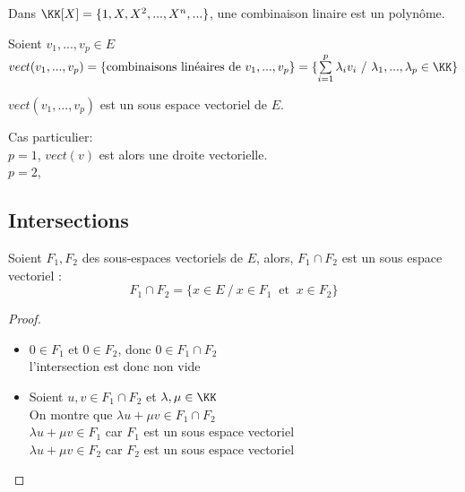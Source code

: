 \documentclass[../main.tex]{subfile}
\begin{document}
\begin{ex}
	Dans $\KK[X] = \{1, X, X^2, ..., X^n, ...\}$, une combinaison linaire est un polynôme.
\end{ex}

\begin{defi}
	Soient $v_1, ..., v_p \in E$\\
	$vect(v_1, ..., v_p) = \{\text{combinaisons linéaires de $v_1, ..., v_p$}\} = \{\sum\limits_{i=1}^p \lambda_i v_i \ / \ \lambda_1, ..., \lambda_p \in \KK\}$
\end{defi}

\begin{prop}
	$vect(v_1, ..., v_p)$ est un sous espace vectoriel de $E$.
\end{prop}

\begin{ex}
	Cas particulier:\\
	$p = 1$, $vect(v)$ est alors une droite vectorielle.\\
	$p=2$, %
\end{ex}

\subsection{Intersections}
\begin{prop}
	Soient $F_1, F_2$ des sous-espaces vectoriels de $E$, 
	alors, $F_1 \cap F_2$ est un sous espace vectoriel :
	$$F_1 \cap F_2 = \{x \in E \ / \ x \in F_1 \ \text{ et } \ x \in F_2\}$$
\end{prop}

\begin{proof}
\begin{itemize}	
	\item $0 \in F_1$ et $0 \in F_2$, donc $0 \in F_1 \cap F_2$\\
	l'intersection est donc non vide

	\item Soient $u, v \in F_1 \cap F_2$ et $\lambda, \mu \in \KK$\\
	On montre que $\lambda u + \mu v \in F_1 \cap F_2$\\
	$\lambda u + \mu v \in F_1$ car $F_1$ est un sous espace vectoriel\\
	$\lambda u + \mu v \in F_2$ car $F_2$ est un sous espace vectoriel\\
\end{itemize}
\end{proof}
\end{document}
